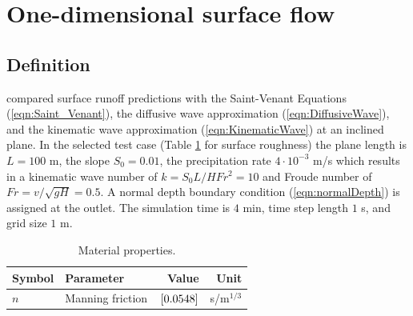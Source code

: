 %
%
\section{One-dimensional surface flow}
\label{sec:Govindaraju}
%
\subsection{Definition}
%
\cite{Gov:88} compared surface runoff predictions with the Saint-Venant Equations (\ref{eqn:Saint_Venant}), the diffusive wave approximation (\ref{eqn:DiffusiveWave}), and 
the kinematic wave approximation (\ref{eqn:KinematicWave}) at an inclined plane.
In the selected test case (Table \ref{tab-govin} for surface roughness) the plane length is $L = 100$ m, the slope $S_0 = 0.01$, the precipitation rate $4 \cdot 10^{-3}$ m/s which results in a
kinematic wave number of $k = S_0 L / H Fr^2 =10$ and Froude number of $Fr = v / \sqrt{gH}= 0.5$. 
A normal depth boundary condition (\ref{eqn:normalDepth}) is assigned at the outlet.
The simulation time is $4$ min, time step length $1$ s, and grid size $1$ m.
%
\begin{table}[!htbp]
\caption{\label{tab-govin}Material properties.}
\begin{center}
\begin{tabular}{llrr}
\toprule
Symbol & Parameter & Value & Unit \\
\midrule
$n$ & Manning friction	  & $\, \mathrm{[}0.0548]{}$   & s/m$^{1/3}$ \\
\bottomrule
\end{tabular}
\end{center}
\end{table}

%
